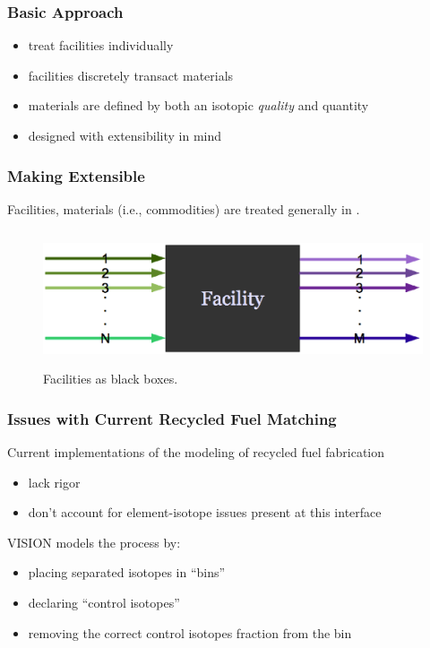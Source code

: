 \begin{frame}[ctb!]
  \frametitle{Basic \Cyclus Approach}

  \begin{itemize}
    \item treat facilities individually
    \item facilities discretely transact materials
    \item materials are defined by both an isotopic \textit{quality} and
      quantity
    \item designed with extensibility in mind
  \end{itemize}

\end{frame}

\begin{frame}[ctb!]
  \frametitle{Making \Cyclus Extensible}
  
  Facilities, materials (i.e., commodities) are treated generally in \Cyclus.

  \begin{figure}
    \includegraphics[height=4cm]{./images/facs.eps}
    \caption{Facilities as black boxes. \cite{cyclus2012}}
    \label{fig:facs}  
  \end{figure}

\end{frame}

\begin{frame}[ctb!]
  \frametitle{Issues with Current Recycled Fuel Matching}
  
  Current implementations of the modeling of recycled fuel fabrication
  \begin{itemize}
    \item lack rigor
    \item don't account for element-isotope issues present at this interface
  \end{itemize}
  
  \vspace{0.2cm}

  VISION models the process by:
  \begin{itemize}
    \item placing separated isotopes in ``bins''
    \item declaring ``control isotopes''
    \item removing the correct control isotopes fraction from the bin
  \end{itemize}
  
\end{frame}

